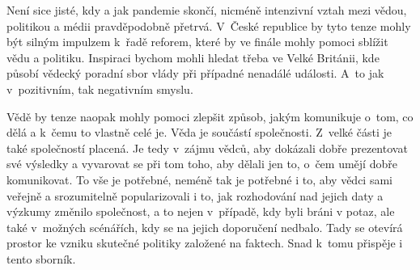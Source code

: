 Není sice jisté, kdy a jak pandemie skončí, nicméně intenzivní vztah mezi vědou, politikou a médii pravděpodobně přetrvá. V~České republice by tyto tenze mohly být silným impulzem k~řadě reforem, které by ve finále mohly pomoci sblížit vědu a politiku. Inspiraci bychom mohli hledat třeba ve Velké Británii, kde působí vědecký poradní sbor vlády při případné nenadálé události. A~to jak v~pozitivním, tak negativním smyslu.

Vědě by tenze naopak mohly pomoci zlepšit způsob, jakým komunikuje o~tom, co dělá a k~čemu to vlastně celé je. Věda je součástí společnosti. Z~velké části je také společností placená. Je tedy v~zájmu vědců, aby dokázali dobře prezentovat své výsledky a vyvarovat se při tom toho, aby dělali jen to, o~čem umějí dobře komunikovat. To vše je potřebné, neméně tak je potřebné i to, aby vědci sami veřejně a srozumitelně popularizovali i to, jak rozhodování nad jejich daty a výzkumy změnilo společnost, a to nejen v~případě, kdy byli bráni v potaz, ale také v~možných scénářích, kdy se na jejich doporučení nedbalo. Tady se otevírá prostor ke vzniku skutečné politiky založené na faktech. Snad k~tomu přispěje i tento sborník.

